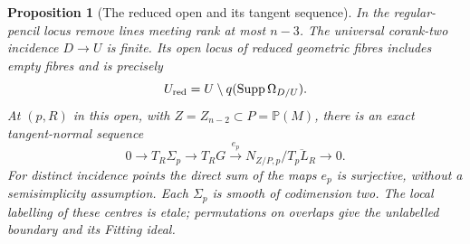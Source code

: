 \documentclass[11pt,reqno]{amsart}
\numberwithin{equation}{section}
\newtheorem{proposition}[theorem]{Proposition}
\theoremstyle{definition}\newtheorem{definition}[theorem]{Definition}
\theoremstyle{remark}\newtheorem{remark}[theorem]{Remark}
\newcommand{\Pj}{\mathbb P}\newcommand{\A}{\mathbb A}
\begin{document}
\begin{proposition}[The reduced open and its tangent sequence]
\label{prop:reduced-details-v162}
In the regular-pencil locus remove lines meeting rank at most $n-3$.
The universal corank-two incidence $D\to U$ is finite. Its open locus
of reduced geometric fibres includes empty fibres and is precisely
\[
 U_{\rm red}=U\setminus q(\operatorname{Supp}\Omega_{D/U}).
\]
At $(p,R)$ in this open, with $Z=Z_{n-2}\subset P=\Pj(M)$,
there is an exact tangent-normal sequence
\begin{equation}\label{eq:tangent-normal-v162}
 0\longrightarrow T_R\Sigma_p\longrightarrow T_RG
 \xrightarrow{\ e_p\ }N_{Z/P,p}/\overline{T_pL_R}
 \longrightarrow0.
\end{equation}
For distinct incidence points the direct sum of the maps $e_p$ is
surjective, without a semisimplicity assumption. Each $\Sigma_p$ is
smooth of codimension two. The local labelling of these centres is
etale; permutations on overlaps give the unlabelled boundary and
its Fitting ideal.
\end{proposition}
\end{document}
